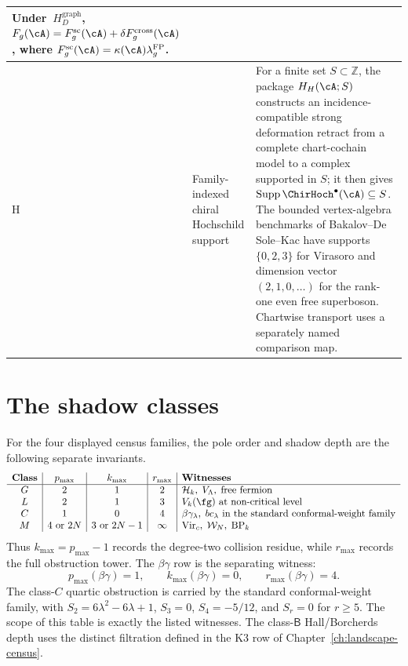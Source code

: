 \begin{center}
\begin{tabular}{|p{1.1cm}|p{4.0cm}|p{8.4cm}|}
Under~$H_D^{\mathrm{graph}}$,
$F_g(\cA)=F_g^{\mathrm{sc}}(\cA)
+\delta F_g^{\mathrm{cross}}(\cA)$, where
$F_g^{\mathrm{sc}}(\cA)=\kappa(\cA)\lambda_g^{\mathrm{FP}}$. \\
\hline
H & Family-indexed chiral Hochschild support &
For a finite set $S\subset\mathbb Z$, the package $H_H(\cA;S)$
constructs an incidence-compatible strong deformation retract from a
complete chart-cochain model to a complex supported in $S$; it then
gives
$\operatorname{Supp}\ChirHoch^\bullet(\cA)\subseteq S$.
The bounded vertex-algebra benchmarks of
Bakalov--De Sole--Kac have supports $\{0,2,3\}$ for Virasoro and
dimension vector $(2,1,0,\ldots)$ for the rank-one even free
superboson.  Chartwise transport uses a separately named comparison
map. \\
\hline
\end{tabular}
\end{center}

\section{The shadow classes}
\label{sec:master-concordance-classification}

For the four displayed census families, the pole order and shadow
depth are the following separate invariants.
\[
\begin{array}{c|c|c|c|l}
\textbf{Class} & p_{\max} & k_{\max} & r_{\max} &
\textbf{Witnesses}\\
\hline
G & 2 & 1 & 2 & \mathcal H_k,\; V_\Lambda,\; \text{free fermion}\\
L & 2 & 1 & 3 & V_k(\fg)\text{ at non-critical level}\\
C & 1 & 0 & 4 & \beta\gamma_\lambda,\; bc_\lambda
\text{ in the standard conformal-weight family}\\
M & 4\text{ or }2N & 3\text{ or }2N-1 & \infty &
\mathrm{Vir}_c,\; \mathcal W_N,\; \mathrm{BP}_k
\end{array}
\]
Thus $k_{\max}=p_{\max}-1$ records the degree-two collision residue,
while $r_{\max}$ records the full obstruction tower.  The
$\beta\gamma$ row is the separating witness:
\[
p_{\max}(\beta\gamma)=1,\qquad
k_{\max}(\beta\gamma)=0,\qquad
r_{\max}(\beta\gamma)=4.
\]
The class-$C$ quartic obstruction is carried by the standard
conformal-weight family, with
$S_2=6\lambda^2-6\lambda+1$, $S_3=0$,
$S_4=-5/12$, and $S_r=0$ for $r\geq5$.
The scope of this table is exactly the listed witnesses.  The
class-$\mathsf B$ Hall/Borcherds depth uses the distinct filtration
defined in the K3 row of Chapter~\ref{ch:landscape-census}.

